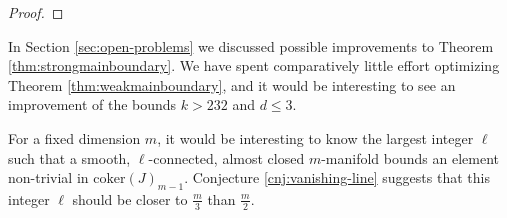\begin{proof}

\end{proof}

\begin{rmk} \label{rmk:open-questions}
In Section \ref{sec:open-problems} we discussed possible improvements to Theorem \ref{thm:strongmainboundary}.
We have spent comparatively little effort optimizing Theorem \ref{thm:weakmainboundary}, and it would be interesting to see an improvement of the bounds $k>232$ and $d \le 3$.

For a fixed dimension $m$, it would be interesting to know the largest integer $\ell$ such that a smooth, $\ell$-connected, almost closed $m$-manifold bounds an element non-trivial in $\mathrm{coker}(J)_{m-1}$.
Conjecture \ref{cnj:vanishing-line} suggests that this integer $\ell$ should be closer to $\frac{m}{3}$ than $\frac{m}{2}$.
\end{rmk}

